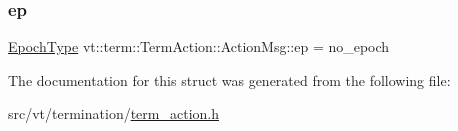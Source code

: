 \mbox{\label{structvt_1_1term_1_1_term_action_1_1_action_msg_ae3b7b713b48328dfaaa98d54a329b1b4}} 
\subsubsection{\texorpdfstring{ep}{ep}}
{\footnotesize\ttfamily \hyperlink{namespacevt_a81d11b28122d43bf9834577e4a06440f}{Epoch\+Type} vt\+::term\+::\+Term\+Action\+::\+Action\+Msg\+::ep = no\+\_\+epoch}



The documentation for this struct was generated from the following file\+:\begin{DoxyCompactItemize}
\item 
src/vt/termination/\hyperlink{term__action_8h}{term\+\_\+action.\+h}\end{DoxyCompactItemize}
